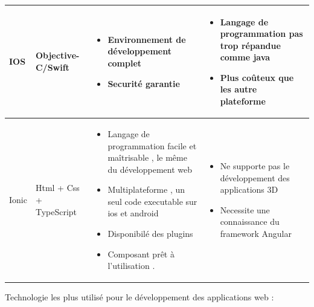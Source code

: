 \documentclass[11pt,a4paper,oneside]{book}
\begin{document}
\begin{center}
\begin{tabular}{ |p{2cm}|p{1.5cm}|p{5.5cm}|p{5.5cm}|  }
			{\centering IOS \par} & \vspace*{\fill} Objective-C/Swift &
			\vspace*{\fill}
			\begin{itemize}
				\item Environnement de développement complet
				\item Securité garantie
			\end{itemize}
			&  \vspace*{\fill}
			\begin{itemize}
				\item Langage de programmation pas trop répandue comme java
				\item Plus coûteux que les autre plateforme
			\end{itemize}
			\\ 
			\hline
			\vspace*{\fill}
			{\centering Ionic  \par}& 
			\vspace*{\fill} Html + Css  + TypeScript & 
			\vspace*{\fill} \begin{itemize}
				\item Langage de programmation facile et maîtrisable , le même du développement web
				\item Multiplateforme , un seul code executable sur ios et android
				\item Disponibilé des plugins
				\item Composant prêt à l’utilisation .
			\end{itemize}
			& \vspace*{\fill}
			\begin{itemize}
				\item Ne supporte pas le développement des applications 3D
				\item Necessite une connaissance du framework Angular
			\end{itemize} 
			
			\\ 
			\hline
		\end{tabular}
	\end{center}
	Technologie les plus utilisé pour le développement des applications web :
	
\end{document}
